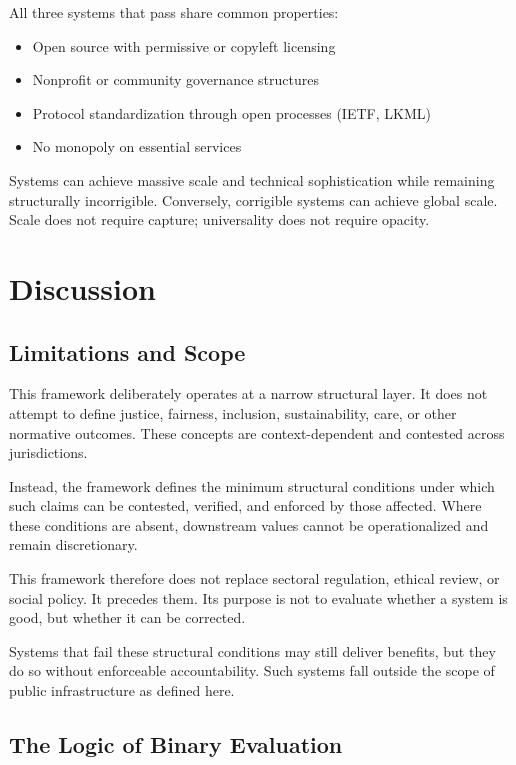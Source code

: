 \documentclass[11pt,a4paper]{article}
\begin{document}
All three systems that pass share common properties:
\begin{itemize}
    \item Open source with permissive or copyleft licensing
    \item Nonprofit or community governance structures
    \item Protocol standardization through open processes (IETF, LKML)
    \item No monopoly on essential services
\end{itemize}

Systems can achieve massive scale and technical sophistication while remaining structurally incorrigible. Conversely, corrigible systems can achieve global scale. Scale does not require capture; universality does not require opacity.

\section{Discussion}

\subsection{Limitations and Scope}

This framework deliberately operates at a narrow structural layer. It does not attempt to define justice, fairness, inclusion, sustainability, care, or other normative outcomes. These concepts are context-dependent and contested across jurisdictions.

Instead, the framework defines the minimum structural conditions under which such claims can be contested, verified, and enforced by those affected. Where these conditions are absent, downstream values cannot be operationalized and remain discretionary.

This framework therefore does not replace sectoral regulation, ethical review, or social policy. It precedes them. Its purpose is not to evaluate whether a system is good, but whether it can be corrected.

Systems that fail these structural conditions may still deliver benefits, but they do so without enforceable accountability. Such systems fall outside the scope of public infrastructure as defined here.

\subsection{The Logic of Binary Evaluation}
\end{document}
